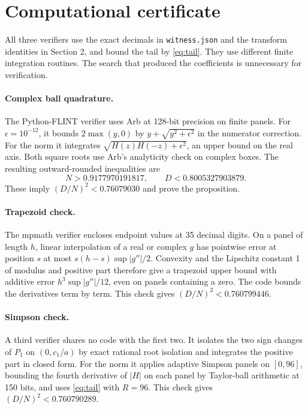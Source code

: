 \documentclass[11pt]{article}
\begin{document}
\newpage
\section{Computational certificate}
All three verifiers use the exact decimals in \texttt{witness.json} and
the transform identities in Section 2, and bound the tail by
\eqref{eq:tail}. They use different finite integration routines.
The search that produced the coefficients is unnecessary for verification.

\paragraph{Complex ball quadrature.}
The Python-FLINT verifier uses Arb at 128-bit precision on finite panels.
For $\epsilon=10^{-12}$, it bounds $2\max(y,0)$ by
$y+\sqrt{y^2+\epsilon^2}$ in the numerator correction. For the norm it
integrates $\sqrt{H(z)H(-z)+\epsilon^2}$, an upper bound on the real
axis. Both square roots use Arb's analyticity check on complex boxes.
The resulting outward-rounded inequalities are
\[
 N>0.9177970191817,\qquad D<0.8005327903879 .
\]
These imply $(D/N)^2<0.76079030$ and prove the proposition.

\paragraph{Trapezoid check.}
The mpmath verifier encloses endpoint values at 35 decimal digits. On a
panel of length $h$, linear interpolation of a real or complex $g$ has
pointwise error at position $s$ at most $s(h-s)\sup|g''|/2$.
Convexity and the Lipschitz constant 1 of modulus and positive part
therefore give a trapezoid upper bound with additive error
$h^3\sup|g''|/12$, even on panels containing a zero. The code bounds
the derivatives term by term. This check gives $(D/N)^2<0.760799446$.

\paragraph{Simpson check.}
A third verifier shares no code with the first two. It isolates the two
sign changes of $P_1$ on $(0,c_1/a)$ by exact rational root isolation and
integrates the positive part in closed form. For the norm it applies
adaptive Simpson panels on $[0,96]$, bounding the fourth derivative of
$|H|$ on each panel by Taylor-ball arithmetic at 150 bits, and uses
\eqref{eq:tail} with $R=96$. This check gives $(D/N)^2<0.760790289$.
\end{document}
